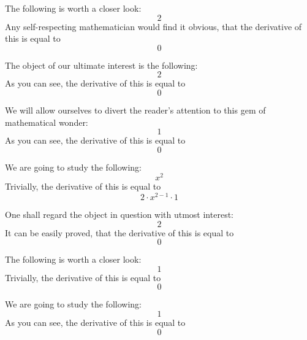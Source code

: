 \documentclass{article}
\begin{document}
The following is worth a closer look:
\begin{equation}
2 
\end{equation}
Any self-respecting mathematician would find it obvious, that the derivative of this is equal to
\begin{equation}
0 
\end{equation}

The object of our ultimate interest is the following:
\begin{equation}
2 
\end{equation}
As you can see, the derivative of this is equal to
\begin{equation}
0 
\end{equation}

We will allow ourselves to divert the reader's attention to this gem of mathematical wonder:
\begin{equation}
1 
\end{equation}
As you can see, the derivative of this is equal to
\begin{equation}
0 
\end{equation}

We are going to study the following:
\begin{equation}
x ^{2 } 
\end{equation}
Trivially, the derivative of this is equal to
\begin{equation}
2 \cdot x ^{2 - 1 } \cdot 1 
\end{equation}

One shall regard the object in question with utmost interest:
\begin{equation}
2 
\end{equation}
It can be easily proved, that the derivative of this is equal to
\begin{equation}
0 
\end{equation}

The following is worth a closer look:
\begin{equation}
1 
\end{equation}
Trivially, the derivative of this is equal to
\begin{equation}
0 
\end{equation}

We are going to study the following:
\begin{equation}
1 
\end{equation}
As you can see, the derivative of this is equal to
\begin{equation}
0 
\end{equation}
\end{document}
